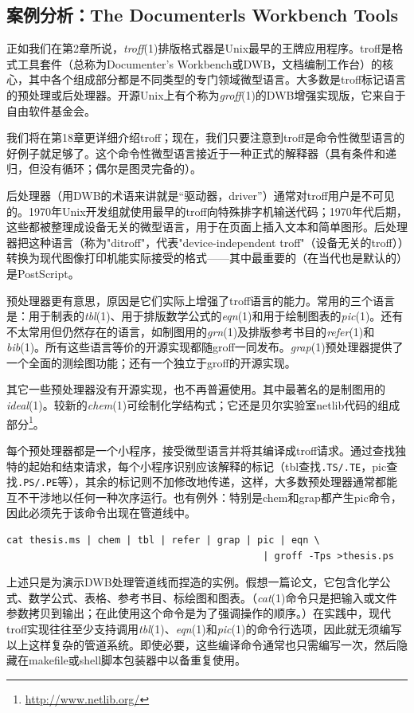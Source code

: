 \documentclass[12pt,oneside]{book}
\begin{document}
\subsection{案例分析：The Documenterls Workbench Tools}
正如我们在第2章所说，\textit{troff}(1)排版格式器是Unix最早的王牌应用程序。troff是格式工具套件（总称为Documenter's Workbench或DWB，文档编制工作台）的核心，其中各个组成部分都是不同类型的专门领域微型语言。大多数是troff标记语言的预处理或后处理器。开源Unix上有个称为\textit{groff}(1)的DWB增强实现版，它来自于自由软件基金会。

我们将在第18章更详细介绍troff；现在，我们只要注意到troff是命令性微型语言的好例子就足够了。这个命令性微型语言接近于一种正式的解释器（具有条件和递归，但没有循环；偶尔是图灵完备的）。

后处理器（用DWB的术语来讲就是“驱动器，driver”）通常对troff用户是不可见的。1970年Unix开发组就使用最早的troff向特殊排字机输送代码；1970年代后期，这些都被整理成设备无关的微型语言，用于在页面上插入文本和简单图形。后处理器把这种语言（称为"ditroff"，代表"device-independent troff"（设备无关的troff））转换为现代图像打印机能实际接受的格式——其中最重要的（在当代也是默认的）是PostScript。

预处理器更有意思，原因是它们实际上增强了troff语言的能力。常用的三个语言是：用于制表的\textit{tbl}(1)、用于排版数学公式的\textit{eqn}(1)和用于绘制图表的\textit{pic}(1)。还有不太常用但仍然存在的语言，如制图用的\textit{grn}(1)及排版参考书目的\textit{refer}(1)和\textit{bib}(1)。所有这些语言等价的开源实现都随groff一同发布。\textit{grap}(1)预处理器提供了一个全面的测绘图功能；还有一个独立于groff的开源实现。

其它一些预处理器没有开源实现，也不再普遍使用。其中最著名的是制图用的\textit{ideal}(1)。较新的\textit{chem}(1)可绘制化学结构式；它还是贝尔实验室netlib代码的组成部分\footnote{\href{http://www.netlib.org/}{http://www.netlib.org/}}。

每个预处理器都是一个小程序，接受微型语言并将其编译成troff请求。通过查找独特的起始和结束请求，每个小程序识别应该解释的标记（tbl查找\verb+.TS/.TE+，pic查找\verb+.PS/.PE+等），其余的标记则不加修改地传递，这样，大多数预处理器通常都能互不干涉地以任何一种次序运行。也有例外：特别是chem和grap都产生pic命令，因此必须先于该命令出现在管道线中。

\begin{Verbatim}
cat thesis.ms | chem | tbl | refer | grap | pic | eqn \
                                             | groff -Tps >thesis.ps
\end{Verbatim}

上述只是为演示DWB处理管道线而捏造的实例。假想一篇论文，它包含化学公式、数学公式、表格、参考书目、标绘图和图表。（\textit{cat}(1)命令只是把输入或文件参数拷贝到输出；在此使用这个命令是为了强调操作的顺序。）在实践中，现代troff实现往往至少支持调用\textit{tbl}(1)、\textit{eqn}(1)和\textit{pic}(1)的命令行选项，因此就无须编写以上这样复杂的管道系统。即使必要，这些编译命令通常也只需编写一次，然后隐藏在makefile或shell脚本包装器中以备重复使用。
\end{document}
